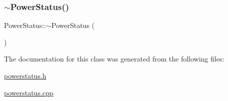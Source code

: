 \subsubsection{\texorpdfstring{$\sim$\+Power\+Status()}{~PowerStatus()}}
{\footnotesize\ttfamily Power\+Status\+::$\sim$\+Power\+Status (\begin{DoxyParamCaption}{ }\end{DoxyParamCaption})}



The documentation for this class was generated from the following files\+:\begin{DoxyCompactItemize}
\item 
\mbox{\hyperlink{powerstatus_8h}{powerstatus.\+h}}\item 
\mbox{\hyperlink{powerstatus_8cpp}{powerstatus.\+cpp}}\end{DoxyCompactItemize}
